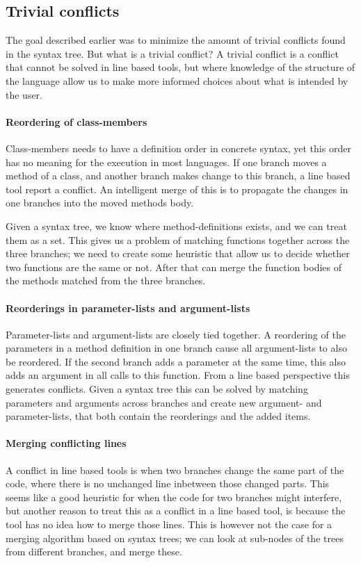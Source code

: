 \documentclass[11pt]{article}
\begin{document}
\subsection{Trivial conflicts}
\label{TrivialConflict}
The goal described earlier was to minimize the amount of trivial conflicts found in the syntax tree. But what is a trivial conflict? A trivial conflict is a conflict that cannot be solved in line based tools, but where knowledge of the structure of the language allow us to make more informed choices about what is intended by the user.


\paragraph{Reordering of class-members} Class-members needs to have a definition order in concrete syntax, yet this order has no meaning for the execution in most languages. If one branch moves a method of a class, and another branch makes change to this branch, a line based tool report a conflict. An intelligent merge of this is to propagate the changes in one branches into the moved methods body.

Given a syntax tree, we know where method-definitions exists, and we can treat them as a set. This gives us a problem of matching functions together across the three branches; we need to create some heuristic that allow us to decide whether two functions are the same or not. After that can merge the function bodies of the methods matched from the three branches.

\paragraph{Reorderings in parameter-lists and argument-lists} Parameter-lists and argument-lists are closely tied together. A reordering of the parameters in a method definition in one branch cause all argument-lists to also be reordered. If the second branch adds a parameter at the same time, this also adds an argument in all calls to this function. From a line based perspective this generates conflicts. Given a syntax tree this can be solved by matching parameters and arguments across branches and create new argument- and parameter-lists, that both contain the reorderings and the added items.

\paragraph{Merging conflicting lines} A conflict in line based tools is when two branches change the same part of the code, where there is no unchanged line inbetween those changed parts. This seems like a good heuristic for when the code for two branches might interfere, but another reason to treat this as a conflict in a line based tool, is because the tool has no idea how to merge those lines. This is however not the case for a merging algorithm based on syntax trees; we can look at sub-nodes of the trees from different branches, and merge these.
\end{document}
